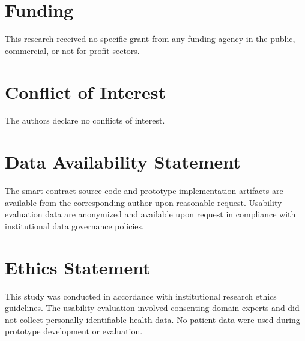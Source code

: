 \documentclass[AMA,LATO1COL]{WileyNJDv5}
\begin{document}
\section*{Funding}
This research received no specific grant from any funding agency in the public, commercial, or not-for-profit sectors.

\section*{Conflict of Interest}
The authors declare no conflicts of interest.

\section*{Data Availability Statement}
The smart contract source code and prototype implementation artifacts are available from the corresponding author upon reasonable request. Usability evaluation data are anonymized and available upon request in compliance with institutional data governance policies.

\section*{Ethics Statement}
This study was conducted in accordance with institutional research ethics guidelines. The usability evaluation involved consenting domain experts and did not collect personally identifiable health data. No patient data were used during prototype development or evaluation.



\end{document}

